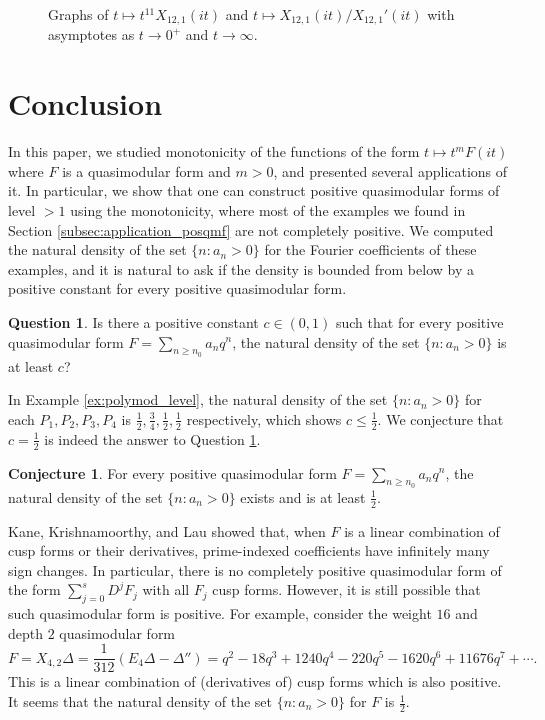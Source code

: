 \documentclass[10pt,reqno]{amsproc}
\newcommand{\1}{\mathds{1}}	%
\theoremstyle{definition}
\newtheorem{question}[theorem]{Question}
\newtheorem{conjecture}[theorem]{Conjecture}
\theoremstyle{remark}
\begin{document}
\begin{figure}[h]%
    \centering
    \subfloat[\centering $t^{11}X_{12, 1}(it)$]{{}}%
    \qquad
    \subfloat[\centering $X_{12, 1}(it) / X_{12, 1}'(it)$]{{}}%
    \caption{Graphs of $t \mapsto t^{11} X_{12, 1}(it)$ and $t \mapsto X_{12, 1}(it) / X_{12, 1}'(it)$ with asymptotes as $t \to 0^+$ and $t \to \infty$.}%
    \label{fig:3b}%
\end{figure}

\section{Conclusion}

In this paper, we studied monotonicity of the functions of the form $t \mapsto t^m F(it)$ where $F$ is a quasimodular form and $m > 0$, and presented several applications of it.
In particular, we show that one can construct positive quasimodular forms of level $> 1$ using the monotonicity, where most of the examples we found in Section \ref{subsec:application_posqmf} are not completely positive.
We computed the natural density of the set $\{n : a_n > 0\}$ for the Fourier coefficients of these examples, and it is natural to ask if the density is bounded from below by a positive constant for every positive quasimodular form.

\begin{question}
    \label{question:density}
    Is there a positive constant $c \in (0, 1)$ such that for every positive quasimodular form $F = \sum_{n \ge n_0} a_n q^n$, the natural density of the set $\{n : a_n > 0\}$ is at least $c$?
\end{question}

In Example \ref{ex:polymod_level}, the natural density of the set $\{n : a_n > 0\}$ for each $P_1, P_2, P_3, P_4$ is $\frac{1}{2}, \frac{3}{4}, \frac{1}{2}, \frac{1}{2}$ respectively, which shows $c \le \frac{1}{2}$.
We conjecture that $c = \frac{1}{2}$ is indeed the answer to Question \ref{question:density}.
\begin{conjecture}
    \label{conj:density}
    For every positive quasimodular form $F = \sum_{n \ge n_0} a_n q^n$, the natural density of the set $\{n : a_n > 0\}$ exists and is at least $\frac{1}{2}$.
\end{conjecture}
Kane, Krishnamoorthy, and Lau \cite{kane2025conjecture} showed that, when $F$ is a linear combination of cusp forms or their derivatives, prime-indexed coefficients have infinitely many sign changes.
In particular, there is no completely positive quasimodular form of the form $\sum_{j=0}^{s} D^j F_j$ with all $F_j$ cusp forms.
However, it is still possible that such quasimodular form is positive.
For example, consider the weight $16$ and depth $2$ quasimodular form
\[
F = X_{4, 2} \Delta = \frac{1}{312} (E_4 \Delta - \Delta'') = q^2 - 18 q^3 + 1240 q^4 - 220 q^5 - 1620 q^6 + 11676 q^7 + \cdots.
\]
This is a linear combination of (derivatives of) cusp forms which is also positive.
It seems that the natural density of the set $\{n : a_n > 0\}$ for $F$ is $\frac{1}{2}$.
\end{document}
